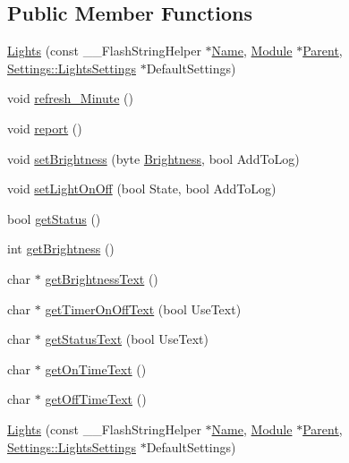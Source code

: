 \subsection*{Public Member Functions}
\begin{DoxyCompactItemize}
\item 
\hyperlink{class_lights_a48acde7f45e4b9b22969e52fea689040}{Lights} (const \+\_\+\+\_\+\+Flash\+String\+Helper $\ast$\hyperlink{class_common_aeea91a726dbe988e515057b32ba0726f}{Name}, \hyperlink{class_module}{Module} $\ast$\hyperlink{class_lights_aae73ad0f2de1a24e5c12add1d302e367}{Parent}, \hyperlink{struct_settings_1_1_lights_settings}{Settings\+::\+Lights\+Settings} $\ast$Default\+Settings)
\item 
void \hyperlink{class_lights_a38c74606e1c2b4ff7db184920b225961}{refresh\+\_\+\+Minute} ()
\item 
void \hyperlink{class_lights_a68fc62af07d71db2fb5a436e11ecad3c}{report} ()
\item 
void \hyperlink{class_lights_a94b8cac76cd536d361b9b634511ac371}{set\+Brightness} (byte \hyperlink{class_lights_ac5fa7d7fdfb9a051a63dde55b67925fe}{Brightness}, bool Add\+To\+Log)
\item 
void \hyperlink{class_lights_ab18f05b043b61b6eb74bd7b564e1a1ec}{set\+Light\+On\+Off} (bool State, bool Add\+To\+Log)
\item 
bool \hyperlink{class_lights_a240cc60cfb0f2b94b1cd9e8a9202b7ee}{get\+Status} ()
\item 
int \hyperlink{class_lights_aea8e88f2668fbcc2d3e36dcfe51fbfa5}{get\+Brightness} ()
\item 
char $\ast$ \hyperlink{class_lights_a9b3e722f1a168d74686e7ee94bf1634b}{get\+Brightness\+Text} ()
\item 
char $\ast$ \hyperlink{class_lights_a8899969e0175e8242f9139c17585bcd0}{get\+Timer\+On\+Off\+Text} (bool Use\+Text)
\item 
char $\ast$ \hyperlink{class_lights_a713a28eba8f6fd8fb259bac4175ece26}{get\+Status\+Text} (bool Use\+Text)
\item 
char $\ast$ \hyperlink{class_lights_a5e2894e6935173e46c8d70f4bc7d36ed}{get\+On\+Time\+Text} ()
\item 
char $\ast$ \hyperlink{class_lights_afa7da12d1c3c6646a547220f34c90bd3}{get\+Off\+Time\+Text} ()
\item 
\hyperlink{class_lights_a48acde7f45e4b9b22969e52fea689040}{Lights} (const \+\_\+\+\_\+\+Flash\+String\+Helper $\ast$\hyperlink{class_common_aeea91a726dbe988e515057b32ba0726f}{Name}, \hyperlink{class_module}{Module} $\ast$\hyperlink{class_lights_aae73ad0f2de1a24e5c12add1d302e367}{Parent}, \hyperlink{struct_settings_1_1_lights_settings}{Settings\+::\+Lights\+Settings} $\ast$Default\+Settings)

\end{DoxyCompactItemize}
